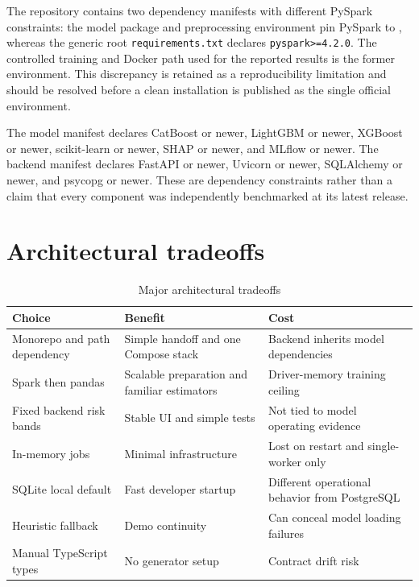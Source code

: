 The repository contains two dependency manifests with different PySpark
constraints: the model package and preprocessing environment pin PySpark to
, whereas the generic root \texttt{requirements.txt} declares
\texttt{pyspark>=4.2.0}. The controlled training and Docker path used for the
reported results is the former  environment. This discrepancy is
retained as a reproducibility limitation and should be resolved before a clean
installation is published as the single official environment.

The model manifest declares CatBoost  or newer, LightGBM
 or newer, XGBoost  or newer, scikit-learn
 or newer, SHAP  or newer, and MLflow  or
newer. The backend manifest declares FastAPI  or newer,
Uvicorn  or newer, SQLAlchemy  or newer, and psycopg
 or newer. These are dependency constraints rather than a claim
that every component was independently benchmarked at its latest release.

\section{Architectural tradeoffs}

\begin{table}[H]
\centering
\small
\setlength{\tabcolsep}{0pt}
\caption{Major architectural tradeoffs}
\label{tab:architecture-tradeoffs}
\begin{tabularx}{\textwidth}{p{}XX}
\toprule
\textbf{Choice} & \textbf{Benefit} & \textbf{Cost}\\
\midrule
Monorepo and path dependency & Simple handoff and one Compose stack & Backend inherits model dependencies\\
Spark then pandas & Scalable preparation and familiar estimators & Driver-memory training ceiling\\
Fixed backend risk bands & Stable UI and simple tests & Not tied to model operating evidence\\
In-memory jobs & Minimal infrastructure & Lost on restart and single-worker only\\
SQLite local default & Fast developer startup & Different operational behavior from PostgreSQL\\
Heuristic fallback & Demo continuity & Can conceal model loading failures\\
Manual TypeScript types & No generator setup & Contract drift risk\\
\bottomrule
\end{tabularx}
\setlength{\tabcolsep}{4pt}
\end{table}


